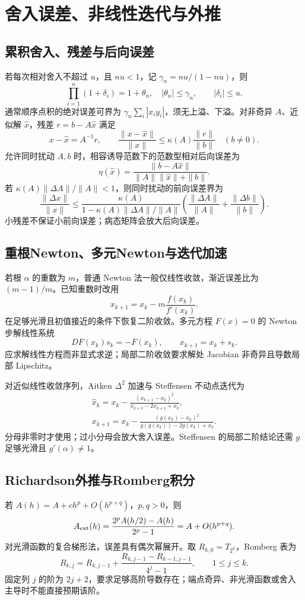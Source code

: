 \documentclass[../main.tex]{subfiles}
\begin{document}
\section{舍入误差、非线性迭代与外推}
\subsection{累积舍入、残差与后向误差}
若每次相对舍入不超过 $u$，且 $nu<1$，记 $\gamma_n=nu/(1-nu)$，则
\[
\prod_{i=1}^n(1+\delta_i)=1+\theta_n,\quad |\theta_n|\le\gamma_n,
\qquad|\delta_i|\le u.
\]
通常顺序点积的绝对误差可界为 $\gamma_n\sum_i|x_iy_i|$，须无上溢、下溢。对非奇异 $A$、近似解 $\widehat x$，残差 $r=b-A\widehat x$ 满足
\[
x-\widehat x=A^{-1}r,\qquad
\frac{\|x-\widehat x\|}{\|x\|}\le\kappa(A)\frac{\|r\|}{\|b\|}\quad(b\ne0).
\]
允许同时扰动 $A,b$ 时，相容诱导范数下的范数型相对后向误差为
\[
\eta(\widehat x)=\frac{\|b-A\widehat x\|}{\|A\|\|\widehat x\|+\|b\|}.
\]
若 $\kappa(A)\|\Delta A\|/\|A\|<1$，则同时扰动的前向误差界为
\[
\frac{\|\Delta x\|}{\|x\|}\le
\frac{\kappa(A)}{1-\kappa(A)\|\Delta A\|/\|A\|}
\left(\frac{\|\Delta A\|}{\|A\|}+\frac{\|\Delta b\|}{\|b\|}\right).
\]
小残差不保证小前向误差；病态矩阵会放大后向误差。

\subsection{重根Newton、多元Newton与迭代加速}
若根 $\alpha$ 的重数为 $m$，普通 Newton 法一般仅线性收敛，渐近误差比为 $(m-1)/m$。已知重数时改用
\[
x_{k+1}=x_k-m\frac{f(x_k)}{f'(x_k)}.
\]
在足够光滑且初值接近的条件下恢复二阶收敛。多元方程 $F(x)=0$ 的 Newton 步解线性系统
\[
DF(x_k)s_k=-F(x_k),\qquad x_{k+1}=x_k+s_k.
\]
应求解线性方程而非显式求逆；局部二阶收敛要求解处 Jacobian 非奇异且导数局部 Lipschitz。

对近似线性收敛序列，Aitken $\Delta^2$ 加速与 Steffensen 不动点迭代为
\begin{gather*}
\widehat x_k=x_k-\frac{(x_{k+1}-x_k)^2}{x_{k+2}-2x_{k+1}+x_k},\\
x_{k+1}=x_k-\frac{(g(x_k)-x_k)^2}{g(g(x_k))-2g(x_k)+x_k}.
\end{gather*}
分母非零时才使用；过小分母会放大舍入误差。Steffensen 的局部二阶结论还需 $g$ 足够光滑且 $g'(\alpha)\ne1$。

\subsection{Richardson外推与Romberg积分}
若 $A(h)=A+ch^p+O(h^{p+q})$，$p,q>0$，则
\[
A_{\rm ext}(h)=\frac{2^pA(h/2)-A(h)}{2^p-1}=A+O(h^{p+q}).
\]
对光滑函数的复合梯形法，误差具有偶次幂展开。取 $R_{k,0}=T_{2^k}$，Romberg 表为
\[
R_{k,j}=R_{k,j-1}+\frac{R_{k,j-1}-R_{k-1,j-1}}{4^j-1},\qquad 1\le j\le k.
\]
固定列 $j$ 的阶为 $2j+2$，要求足够高阶导数存在；端点奇异、非光滑函数或舍入主导时不能直接预期该阶。
\end{document}
